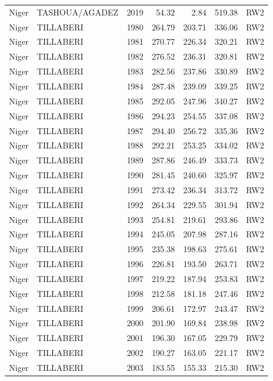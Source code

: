 \begin{longtable}{lllrrrl}
  Niger & TASHOUA/AGADEZ & 2019 & 54.32 & 2.84 & 519.38 & RW2 \\ 
  Niger & TILLABERI & 1980 & 264.79 & 203.71 & 336.06 & RW2 \\ 
  Niger & TILLABERI & 1981 & 270.77 & 226.34 & 320.21 & RW2 \\ 
  Niger & TILLABERI & 1982 & 276.52 & 236.31 & 320.81 & RW2 \\ 
  Niger & TILLABERI & 1983 & 282.56 & 237.86 & 330.89 & RW2 \\ 
  Niger & TILLABERI & 1984 & 287.48 & 239.09 & 339.25 & RW2 \\ 
  Niger & TILLABERI & 1985 & 292.05 & 247.96 & 340.27 & RW2 \\ 
  Niger & TILLABERI & 1986 & 294.23 & 254.55 & 337.08 & RW2 \\ 
  Niger & TILLABERI & 1987 & 294.40 & 256.72 & 335.36 & RW2 \\ 
  Niger & TILLABERI & 1988 & 292.21 & 253.25 & 334.02 & RW2 \\ 
  Niger & TILLABERI & 1989 & 287.86 & 246.49 & 333.73 & RW2 \\ 
  Niger & TILLABERI & 1990 & 281.45 & 240.60 & 325.97 & RW2 \\ 
  Niger & TILLABERI & 1991 & 273.42 & 236.34 & 313.72 & RW2 \\ 
  Niger & TILLABERI & 1992 & 264.34 & 229.55 & 301.94 & RW2 \\ 
  Niger & TILLABERI & 1993 & 254.81 & 219.61 & 293.86 & RW2 \\ 
  Niger & TILLABERI & 1994 & 245.05 & 207.98 & 287.16 & RW2 \\ 
  Niger & TILLABERI & 1995 & 235.38 & 198.63 & 275.61 & RW2 \\ 
  Niger & TILLABERI & 1996 & 226.81 & 193.50 & 263.71 & RW2 \\ 
  Niger & TILLABERI & 1997 & 219.22 & 187.94 & 253.83 & RW2 \\ 
  Niger & TILLABERI & 1998 & 212.58 & 181.18 & 247.46 & RW2 \\ 
  Niger & TILLABERI & 1999 & 206.61 & 172.97 & 243.47 & RW2 \\ 
  Niger & TILLABERI & 2000 & 201.90 & 169.84 & 238.98 & RW2 \\ 
  Niger & TILLABERI & 2001 & 196.30 & 167.05 & 229.79 & RW2 \\ 
  Niger & TILLABERI & 2002 & 190.27 & 163.05 & 221.17 & RW2 \\ 
  Niger & TILLABERI & 2003 & 183.55 & 155.33 & 215.30 & RW2 \\ 

\end{longtable}
